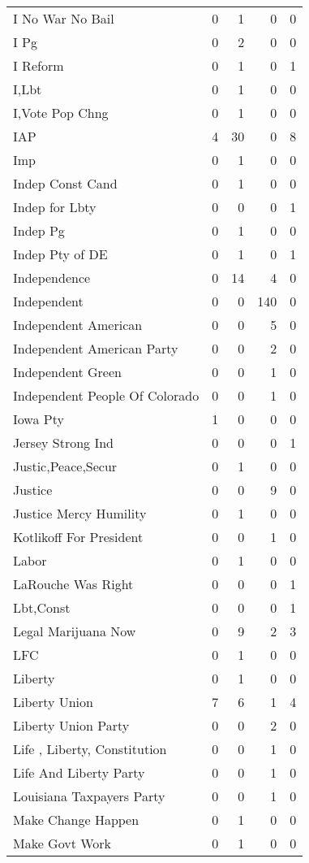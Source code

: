 \begin{supertabular}{lrrrr}
I No War No Bail & 0 & 1 & 0 & 0\\
I Pg & 0 & 2 & 0 & 0\\
I Reform & 0 & 1 & 0 & 1\\
I,Lbt & 0 & 1 & 0 & 0\\
I,Vote Pop Chng & 0 & 1 & 0 & 0\\
IAP & 4 & 30 & 0 & 8\\
Imp & 0 & 1 & 0 & 0\\
Indep Const Cand & 0 & 1 & 0 & 0\\
Indep for Lbty & 0 & 0 & 0 & 1\\
Indep Pg & 0 & 1 & 0 & 0\\
Indep Pty of DE & 0 & 1 & 0 & 1\\
Independence & 0 & 14 & 4 & 0\\
Independent & 0 & 0 & 140 & 0\\
Independent American & 0 & 0 & 5 & 0\\
Independent American Party & 0 & 0 & 2 & 0\\
Independent Green & 0 & 0 & 1 & 0\\
Independent People Of Colorado & 0 & 0 & 1 & 0\\
Iowa Pty & 1 & 0 & 0 & 0\\
Jersey Strong Ind & 0 & 0 & 0 & 1\\
Justic,Peace,Secur & 0 & 1 & 0 & 0\\
Justice & 0 & 0 & 9 & 0\\
Justice Mercy Humility & 0 & 1 & 0 & 0\\
Kotlikoff For President & 0 & 0 & 1 & 0\\
Labor & 0 & 1 & 0 & 0\\
LaRouche Was Right & 0 & 0 & 0 & 1\\
Lbt,Const & 0 & 0 & 0 & 1\\
Legal Marijuana Now & 0 & 9 & 2 & 3\\
LFC & 0 & 1 & 0 & 0\\
Liberty & 0 & 1 & 0 & 0\\
Liberty Union & 7 & 6 & 1 & 4\\
Liberty Union Party & 0 & 0 & 2 & 0\\
Life , Liberty, Constitution & 0 & 0 & 1 & 0\\
Life And Liberty Party & 0 & 0 & 1 & 0\\
Louisiana Taxpayers Party & 0 & 0 & 1 & 0\\
Make Change Happen & 0 & 1 & 0 & 0\\
Make Govt Work & 0 & 1 & 0 & 0\\

\end{supertabular}
